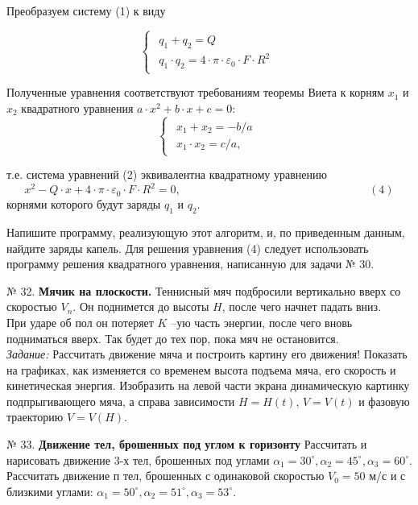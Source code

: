 Преобразуем систему (1) к виду  

\begin{equation}
 \begin{cases}
 \begin{aligned}
   q_1 + q_2 = Q\\
   q_1\cdot q_2 = {4\cdot\pi\cdot\varepsilon_0}\cdot F\cdot R^2
      \end{aligned}
 \end{cases}
\end{equation}

Полученные уравнения соответствуют требованиям теоремы Виета к корням $x_1$ и $x_2$ квадратного уравнения 
$a\cdot x^2 + b\cdot x +c = 0:$
\begin{equation}
 \begin{cases}
  \begin{aligned}
   x_1 + x_2 = -b/a\\
   x_1\cdot x_2 = c/a, 
      \end{aligned}
 \end{cases}
\end{equation}

т.е. система уравнений (2) эквивалентна квадратному уравнению
$$x^2 - Q\cdot x + 4\cdot\pi\cdot\varepsilon_0\cdot F\cdot R^2 = 0,  \hspace{200pt} (4)$$
    корнями которого будут заряды $q_1$ и $q_2$.
 
Напишите программу, реализующую этот алгоритм, и, по приведенным данным, найдите заряды капель. Для решения уравнения (4) следует использовать программу решения квадратного уравнения, написанную для задачи № 30.

№ 32. {\bf Мячик на плоскости.}
Теннисный мяч подбросили вертикально вверх со скоростью $V_n$. Он поднимется до высоты $H$, после чего начнет падать вниз.\\
При ударе об пол он потеряет $K$ --ую часть энергии, после чего вновь подниматься вверх. Так будет до тех пор, пока мяч не остановится.\\
{\em Задание:} Рассчитать движение мяча и построить картину его движения! Показать на графиках, как изменяется со временем высота подъема мяча, его скорость и кинетическая энергия. Изобразить на левой части экрана динамическую картинку подпрыгивающего мяча, а справа зависимости  $H= H(t)$, $V= V(t)$ и фазовую траекторию $V= V(H)$.

№ 33. {\bf Движение тел, брошенных под углом к горизонту} Рассчитать и нарисовать движение 3-х тел, брошенных под углами $\alpha_1 =30^\circ, \alpha_2 = 45^\circ, \alpha_3 =60^\circ$.  Рассчитать движение $п$ тел, брошенных с одинаковой скоростью   $V_0=50$ м/с  и с близкими углами: $\alpha_1 = 50^\circ, \alpha_2 = 51^\circ, \alpha_3 = 53^\circ$.

